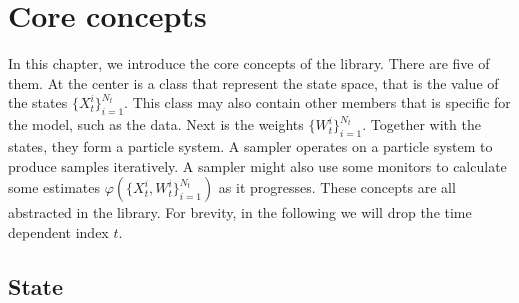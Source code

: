 \chapter{Core concepts}
\label{chap:Core concepts}

In this chapter, we introduce the core concepts of the library. There are five
of them. At the center is a class that represent the state space, that is the
value of the states $\{X_t^i\}_{i=1}^{N_t}$. This class may also contain other
members that is specific for the model, such as the data. Next is the weights
$\{W_t^i\}_{i=1}^{N_t}$. Together with the states, they form a particle system.
A sampler operates on a particle system to produce samples iteratively. A
sampler might also use some monitors to calculate some estimates
$\varphi(\{X_t^i,W_t^i\}_{i=1}^{N_t})$ as it progresses. These concepts are all
abstracted in the library. For brevity, in the following we will drop the time
dependent index $t$.

\section{State}
\label{sec:State}

